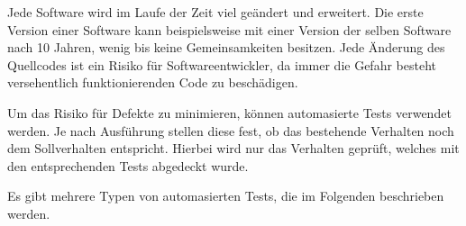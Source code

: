 Jede Software wird im Laufe der Zeit viel geändert und erweitert.
Die erste Version einer Software kann beispielsweise mit einer Version der selben Software nach 10 Jahren, wenig bis keine Gemeinsamkeiten besitzen.
Jede Änderung des Quellcodes ist ein Risiko für Softwareentwickler, da immer die Gefahr besteht versehentlich funktionierenden Code zu beschädigen.

Um das Risiko für Defekte zu minimieren, können automasierte Tests verwendet werden. Je nach Ausführung stellen diese fest,
ob das bestehende Verhalten noch dem Sollverhalten entspricht. Hierbei wird nur das Verhalten geprüft, 
welches mit den entsprechenden Tests abgedeckt wurde.

Es gibt mehrere Typen von automasierten Tests, die im Folgenden beschrieben werden.

